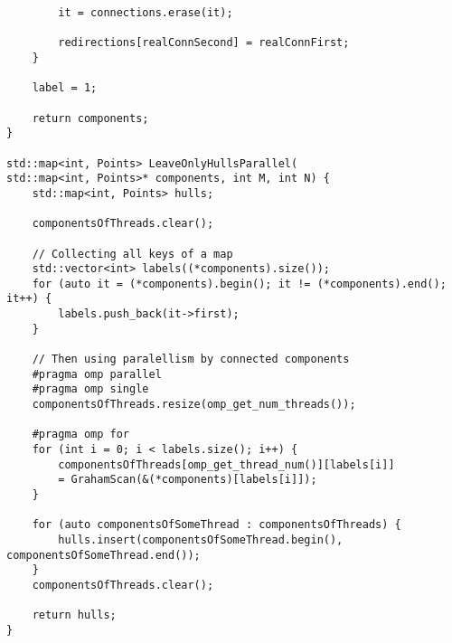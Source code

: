 \documentclass[14pt, russian]{extarticle}
\begin{document}
\begin{lstlisting}
		it = connections.erase(it);
		
		redirections[realConnSecond] = realConnFirst;
	}
	
	label = 1;
	
	return components;
}

std::map<int, Points> LeaveOnlyHullsParallel(
std::map<int, Points>* components, int M, int N) {
	std::map<int, Points> hulls;
	
	componentsOfThreads.clear();
	
	// Collecting all keys of a map
	std::vector<int> labels((*components).size());
	for (auto it = (*components).begin(); it != (*components).end(); it++) {
		labels.push_back(it->first);
	}
	
	// Then using paralellism by connected components
	#pragma omp parallel
	#pragma omp single
	componentsOfThreads.resize(omp_get_num_threads());
	
	#pragma omp for
	for (int i = 0; i < labels.size(); i++) {
		componentsOfThreads[omp_get_thread_num()][labels[i]]
		= GrahamScan(&(*components)[labels[i]]);
	}
	
	for (auto componentsOfSomeThread : componentsOfThreads) {
		hulls.insert(componentsOfSomeThread.begin(), componentsOfSomeThread.end());
	}
	componentsOfThreads.clear();
	
	return hulls;
}
	\end{lstlisting}
	\newpage
	
\end{document}
